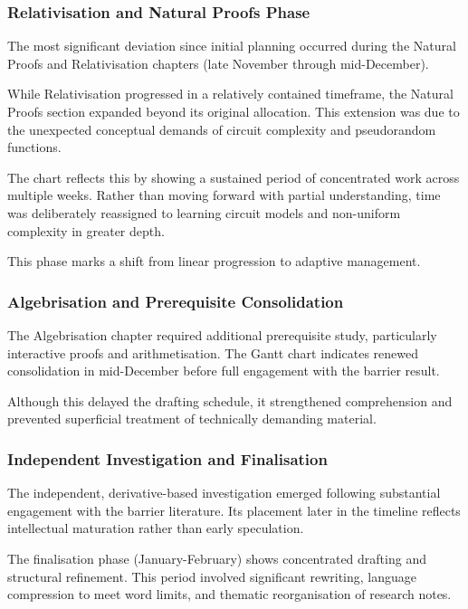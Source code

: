 \documentclass[12pt]{article}
\begin{document}
\subsubsection*{Relativisation and Natural Proofs Phase}

The most significant deviation since initial planning occurred during the Natural Proofs and Relativisation chapters (late November through mid-December).

While Relativisation progressed in a relatively contained timeframe, the Natural Proofs section expanded beyond its original allocation. This extension was due to the unexpected conceptual demands of circuit complexity and pseudorandom functions. 

The chart reflects this by showing a sustained period of concentrated work across multiple weeks. Rather than moving forward with partial understanding, time was deliberately reassigned to learning circuit models and non-uniform complexity in greater depth.

This phase marks a shift from linear progression to adaptive management.

\subsubsection*{Algebrisation and Prerequisite Consolidation}

The Algebrisation chapter required additional prerequisite study, particularly interactive proofs and arithmetisation. The Gantt chart indicates renewed consolidation in mid-December before full engagement with the barrier result.

Although this delayed the drafting schedule, it strengthened comprehension and prevented superficial treatment of technically demanding material.

\subsubsection*{Independent Investigation and Finalisation}

The independent, derivative-based investigation emerged following substantial engagement with the barrier literature. Its placement later in the timeline reflects intellectual maturation rather than early speculation.

The finalisation phase (January-February) shows concentrated drafting and structural refinement. This period involved significant rewriting, language compression to meet word limits, and thematic reorganisation of research notes.
\end{document}
